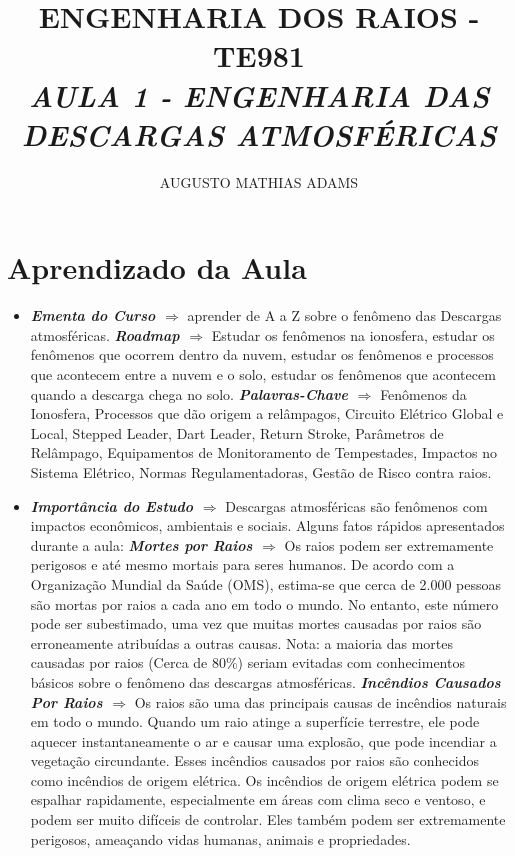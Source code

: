 \documentclass[a4paper, 12pt, onecolumn,singlespacing]{article}
\title{\normalsize{ENGENHARIA DOS RAIOS - TE981}\\ \huge{\textbf\textit{{AULA 1 - ENGENHARIA DAS DESCARGAS ATMOSFÉRICAS}}\\}}
\author{\small{AUGUSTO MATHIAS ADAMS}}
\begin{document}
	
	\maketitle
	
	\section{Aprendizado da Aula}
	
	\begin{itemize}
		\item \textbf{\textit{Ementa do Curso $\Rightarrow$ }} aprender de A a Z sobre o fenômeno das Descargas atmosféricas.
		\subitem \textbf{\textit{Roadmap $\Rightarrow$}} Estudar os fenômenos na ionosfera,  estudar os fenômenos que ocorrem dentro da nuvem, estudar os fenômenos e processos que acontecem entre a nuvem e o solo, estudar os fenômenos que acontecem quando a descarga chega no solo.
		\subitem \textbf{\textit{Palavras-Chave $\Rightarrow$ }} Fenômenos da Ionosfera, Processos que dão origem a relâmpagos, Circuito Elétrico Global e Local, Stepped Leader, Dart Leader, Return Stroke, Parâmetros de Relâmpago, Equipamentos de Monitoramento de Tempestades, Impactos no Sistema Elétrico, Normas Regulamentadoras, Gestão de Risco contra raios.
		\item \textbf{\textit{Importância do Estudo $\Rightarrow$ }} Descargas atmosféricas são fenômenos com impactos econômicos, ambientais e sociais. Alguns fatos rápidos apresentados durante a aula:
		\subitem \textbf{\textit{Mortes por Raios $\Rightarrow$}}  Os raios podem ser extremamente perigosos e até mesmo mortais para seres humanos. De acordo com a Organização Mundial da Saúde (OMS), estima-se que cerca de 2.000 pessoas são mortas por raios a cada ano em todo o mundo. No entanto, este número pode ser subestimado, uma vez que muitas mortes causadas por raios são erroneamente atribuídas a outras causas. Nota: a maioria das mortes causadas por raios (Cerca de 80\%) seriam evitadas com conhecimentos básicos sobre o fenômeno das descargas atmosféricas.
		\subitem \textbf{\textit{Incêndios Causados Por Raios $\Rightarrow$}} Os raios são uma das principais causas de incêndios naturais em todo o mundo. Quando um raio atinge a superfície terrestre, ele pode aquecer instantaneamente o ar e causar uma explosão, que pode incendiar a vegetação circundante. Esses incêndios causados por raios são conhecidos como incêndios de origem elétrica. Os incêndios de origem elétrica podem se espalhar rapidamente, especialmente em áreas com clima seco e ventoso, e podem ser muito difíceis de controlar. Eles também podem ser extremamente perigosos, ameaçando vidas humanas, animais e propriedades.

\end{itemize}
\end{document}
